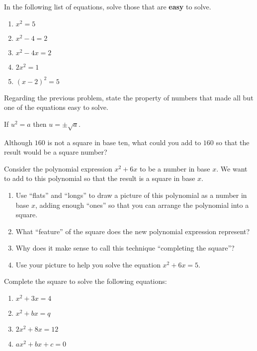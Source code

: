 \begin{prob}
In the following list of equations, solve those that are \textbf{easy} to solve.  
\begin{enumerate}
\item $x^2=5$
\item $x^2 - 4 = 2$
\item $x^2 - 4x = 2$
\item $2x^2=1$
\item $(x-2)^2=5$
\end{enumerate}
\end{prob}
\vspace{0.3in}

\begin{prob}
Regarding the previous problem, state the property of numbers that made all but one of the equations easy to solve.  
\end{prob}
\vspace{0.3in}

\begin{teachingnote}
If $u^2=a$ then $u=\pm\sqrt{a}$.
\end{teachingnote}

\begin{prob}
Although $160$ is not a square in base ten, what could you add to $160$ so that the result would be a square number?  
\end{prob}

\begin{prob}
 Consider the polynomial expression $x^2+6x$ to be a number in base $x$.  We want to add to this polynomial so that the result is a square in base $x$.  
\begin{enumerate}
\item Use ``flats'' and ``longs'' to draw a picture of this polynomial as a number in base $x$, adding enough ``ones'' so that you can arrange the polynomial into a square.  
\vspace{0.5in}
\item What ``feature'' of the square does the new polynomial expression represent?  
\item Why does it make sense to call this technique ``completing the square''? 
\item Use your picture to help you solve the equation $x^2+6x=5$.  
\end{enumerate}
\end{prob}

\newpage

\begin{prob}
Complete the square to solve the following equations: 
\begin{enumerate}
\item $x^2+3x=4$
\vspace{.8in}
\item $x^2+bx=q$
\vspace{.8in}
\item $2x^2+8x=12$
\vspace{.8in}
\item $ax^2+bx+c=0$
\vspace{.8in}
\end{enumerate}  
\end{prob}

